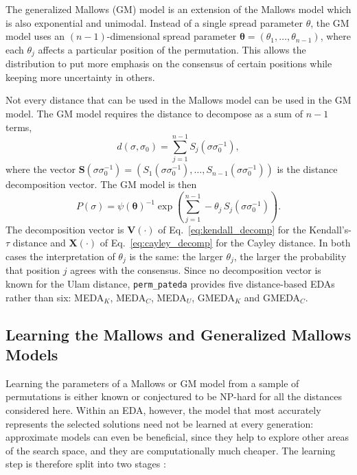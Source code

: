 \documentclass[a4paper,11pt]{article}
\begin{document}
The generalized Mallows (GM) model \citep{Fligner_and_Verducci:1986} is an
extension of the Mallows model which is also exponential and unimodal.  Instead
of a single spread parameter $\theta$, the GM model uses an $(n-1)$-dimensional
spread parameter $\bm{\theta} = (\theta_1,\ldots,\theta_{n-1})$, where each
$\theta_j$ affects a particular position of the permutation.  This allows the
distribution to put more emphasis on the consensus of certain positions while
keeping more uncertainty in others.

Not every distance that can be used in the Mallows model can be used in the GM
model.  The GM model requires the distance to decompose as a sum of $n-1$ terms,
\begin{equation}
d(\sigma, \sigma_0) = \sum_{j=1}^{n-1} S_j(\sigma\sigma_0^{-1}) ,
\label{eq:decomp}
\end{equation}
where the vector
$\mathbf{S}(\sigma\sigma_0^{-1}) = (S_1(\sigma\sigma_0^{-1}),\ldots,S_{n-1}(\sigma\sigma_0^{-1}))$
is the distance decomposition vector.  The GM model is then
\begin{equation}
P(\sigma) = \psi(\bm{\theta})^{-1}
  \exp\left(\sum_{j=1}^{n-1} -\theta_j\, S_j(\sigma \sigma_0^{-1})\right) .
\label{eq:gmallows}
\end{equation}
The decomposition vector is $\mathbf{V}(\cdot)$ of
Eq.~\eqref{eq:kendall_decomp} for the Kendall's-$\tau$ distance and
$\mathbf{X}(\cdot)$ of Eq.~\eqref{eq:cayley_decomp} for the Cayley distance.  In
both cases the interpretation of $\theta_j$ is the same: the larger $\theta_j$,
the larger the probability that position $j$ agrees with the consensus.  Since no
decomposition vector is known for the Ulam distance, \texttt{perm\_pateda}
provides five distance-based EDAs rather than six:
MEDA$_K$, MEDA$_C$, MEDA$_U$, GMEDA$_K$ and GMEDA$_C$.

\subsection{Learning the Mallows and Generalized Mallows Models}
\label{sec:learning_mallows}

Learning the parameters of a Mallows or GM model from a sample of permutations is
either known or conjectured to be NP-hard for all the distances considered here.
Within an EDA, however, the model that most accurately represents the selected
solutions need not be learned at every generation: approximate models can even be
beneficial, since they help to explore other areas of the search space, and they
are computationally much cheaper.  The learning step is therefore split into two
stages \citep{Irurozki:2014}:
\end{document}
